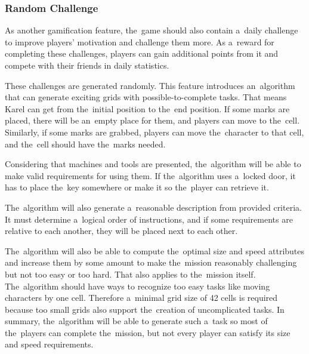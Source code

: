 \subsubsection{Random Challenge}

As another gamification feature, the~game should also contain a~daily challenge to improve players' motivation and challenge them more. 
As a~reward for completing these challenges, players can gain additional points from it and compete with their friends in daily statistics.

These challenges are generated randomly.
This feature introduces an~algorithm that can generate exciting grids with possible-to-complete tasks.
That means Karel can get from the~initial position to the~end position.
If some marks are placed, there will be an~empty place for them, and players can move to the~cell.
Similarly, if some marks are grabbed, players can move the~character to that cell, and the~cell should have the~marks needed.

Considering that machines and tools are presented,
the~algorithm will be able to make valid requirements for using them.
If the~algorithm uses a~locked door, it has to place the~key somewhere or make it so the~player can retrieve it.

The~algorithm will also generate a~reasonable description from provided criteria.
It must determine a~logical order of instructions, and if some requirements are relative to each another, they will be placed next to each other.

The~algorithm will also be able to compute the~optimal size and speed attributes and increase them by some amount to make the~mission reasonably challenging but not too easy or too hard.
That also applies to the~mission itself.
The~algorithm should have ways to recognize too easy tasks like moving characters by one cell.
Therefore a~minimal grid size of 42 cells is required because too small grids also support the~creation of uncomplicated tasks.
In summary, the~algorithm will be able to generate such a~task so most of the~players can complete the~mission, but not every player can satisfy its size and speed requirements.
